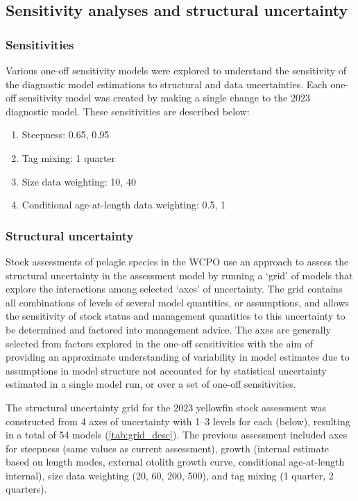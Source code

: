 \subsection{Sensitivity analyses and structural uncertainty}
\label{sec:sensitivity_structural_uncertainty}

\subsubsection{Sensitivities}
\label{sec:sensitivities}

Various one-off sensitivity models were explored to understand the sensitivity of the diagnostic model estimations to structural and data uncertainties. Each one-off sensitivity model was created by making a single change to the 2023 diagnostic model. These sensitivities are described below:

\begin{enumerate}
  \item Steepness: 0.65, 0.95
  \item Tag mixing: 1 quarter
  \item Size data weighting: 10, 40
  \item Conditional age-at-length data weighting: 0.5, 1
\end{enumerate}

\subsubsection{Structural uncertainty}
\label{sec:uncertainty_grid}

Stock assessments of pelagic species in the WCPO use an approach to assess the structural uncertainty in the assessment model by running a `grid' of models that explore the interactions among selected `axes' of uncertainty. The grid contains all combinations of levels of several model quantities, or assumptions, and allows the sensitivity of stock status and management quantities to this uncertainty to be determined and factored into management advice. The axes are generally selected from factors explored in the one-off sensitivities with the aim of providing an approximate understanding of variability in model estimates due to assumptions in model structure not accounted for by statistical uncertainty estimated in a single model run, or over a set of one-off sensitivities.

The structural uncertainty grid for the 2023 yellowfin stock assessment was constructed from 4 axes of uncertainty with 1--3 levels for each (below), resulting in a total of 54 models (\autoref{tab:grid_desc}). The previous assessment included axes for steepness (same values as current assessment), growth (internal estimate based on length modes, external otolith growth curve, conditional age-at-length internal), size data weighting (20, 60, 200, 500), and tag mixing (1 quarter, 2 quarters).

